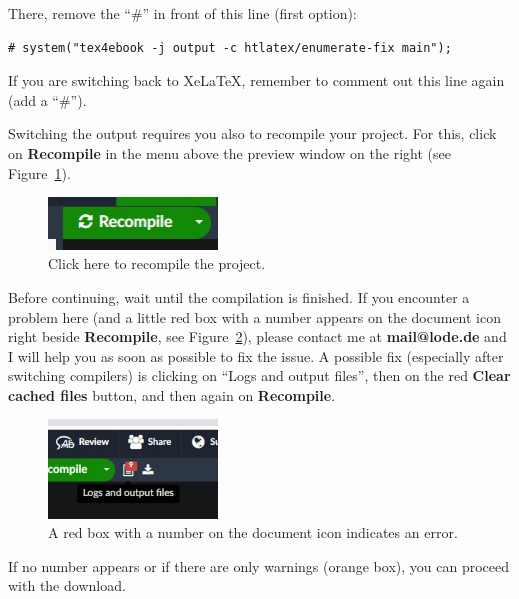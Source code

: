 There, remove the ``\#'' in front of this line (first option):

\begin{lstlisting}
# system("tex4ebook -j output -c htlatex/enumerate-fix main");
\end{lstlisting}

If you are switching back to XeLaTeX, remember to comment out this line again (add a ``\#'').

Switching the output requires you also to recompile your project. For this, click on \textbf{Recompile} in the menu above the preview window on the right (see Figure~\ref{recompile:fig}).


\begin{figure}[H]\centering
\includegraphics[width=0.4\textwidth]{images/recompile.jpg}
\caption{Click here to recompile the project.}
\label{recompile:fig}
\end{figure}

Before continuing, wait until the compilation is finished. If you encounter a problem here (and a little red box with a number appears on the document icon right beside \textbf{Recompile}, see Figure~\ref{error:fig}), please contact me at \textbf{mail@lode.de} and I will help you as soon as possible to fix the issue. A possible fix (especially after switching compilers) is clicking on ``Logs and output files'', then on the red \textbf{Clear cached files} button, and then again on \textbf{Recompile}.

\begin{figure}[H]\centering
\includegraphics[width=0.4\textwidth]{images/error.jpg}
\caption{A red box with a number on the document icon indicates an error.}
\label{error:fig}
\end{figure}

If no number appears or if there are only warnings (orange box), you can proceed with the download. 

